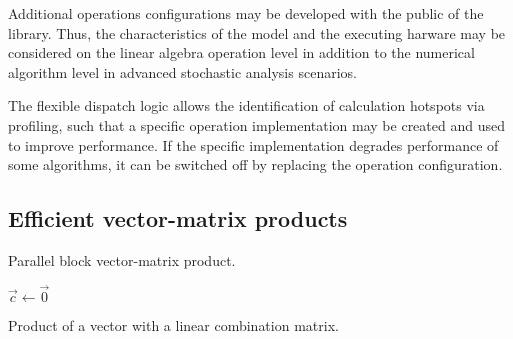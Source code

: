 Additional operations configurations may be developed with the public
 of the library. Thus, the characteristics of the model
and the executing harware may be considered on the linear algebra
operation level in addition to the numerical algorithm level in
advanced stochastic analysis scenarios.

The flexible dispatch logic allows the identification of calculation
hotspots via profiling, such that a specific operation implementation
may be created and used to improve performance. If the specific
implementation degrades performance of some algorithms, it can be
switched off by replacing the operation configuration.

\subsection{Efficient vector-matrix products}
\label{sec:algorithms:vector-matrix}

\begin{algorithm}
  \;
  \caption{Parallel block vector-matrix product.}
  \label{alg:algorithms:matmul:block}
\end{algorithm}

\begin{algorithm}
  $\vec{c} \gets \vec{0}$
  \;
  \caption{Product of a vector with a linear combination matrix.}
  \label{alg:algorithms:matmul:lincomb}
\end{algorithm}

